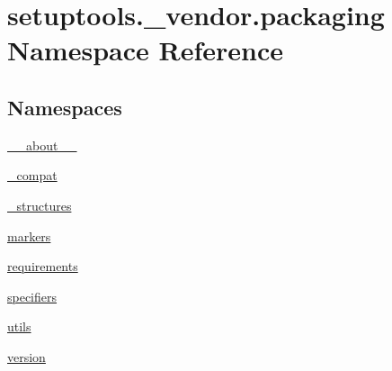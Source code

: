 \hypertarget{namespacesetuptools_1_1__vendor_1_1packaging}{}\section{setuptools.\+\_\+vendor.\+packaging Namespace Reference}
\label{namespacesetuptools_1_1__vendor_1_1packaging}
\subsection*{Namespaces}
\begin{DoxyCompactItemize}
\item 
 \hyperlink{namespacesetuptools_1_1__vendor_1_1packaging_1_1____about____}{\+\_\+\+\_\+about\+\_\+\+\_\+}
\item 
 \hyperlink{namespacesetuptools_1_1__vendor_1_1packaging_1_1__compat}{\+\_\+compat}
\item 
 \hyperlink{namespacesetuptools_1_1__vendor_1_1packaging_1_1__structures}{\+\_\+structures}
\item 
 \hyperlink{namespacesetuptools_1_1__vendor_1_1packaging_1_1markers}{markers}
\item 
 \hyperlink{namespacesetuptools_1_1__vendor_1_1packaging_1_1requirements}{requirements}
\item 
 \hyperlink{namespacesetuptools_1_1__vendor_1_1packaging_1_1specifiers}{specifiers}
\item 
 \hyperlink{namespacesetuptools_1_1__vendor_1_1packaging_1_1utils}{utils}
\item 
 \hyperlink{namespacesetuptools_1_1__vendor_1_1packaging_1_1version}{version}
\end{DoxyCompactItemize}
